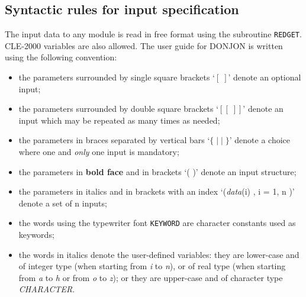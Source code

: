 \subsection{Syntactic rules for input specification}\label{sect:spec}

\vskip 0.2cm
The input data to any module is read in free format using the subroutine 
{\tt REDGET}. CLE-2000 variables\cite{ganlib5,cle2000} are also allowed.
The user guide for DONJON is written using the following convention:

\begin{itemize}

\item the parameters surrounded by single square brackets `$[\;]$' 
denote an optional input;

\item the parameters surrounded by double square brackets `$[[\;]]$' 
denote an input which may be repeated as many times as needed;

\item the parameters in braces separated by vertical bars `$\{\; |\; |\; \}$' 
denote a choice where one and {\sl only} one input is mandatory;

\item the parameters in {\bf{bold face}} and in brackets `( )' 
denote an input structure;

\item the parameters in italics and in brackets with an index 
`({\it data}(i) ,  i = 1, n )' denote a set of n inputs;

\item the words using the typewriter font {\tt KEYWORD} are
character constants used as keywords;

\item the words in italics denote the user-defined variables:
they are lower-case and of integer type (when starting from
{\it i} to {\it n}), or of real type (when starting from {\it a} to {\it h} or from
{\it o} to {\it z}); or they are upper-case and of character type {\it CHARACTER}.

\end{itemize}
